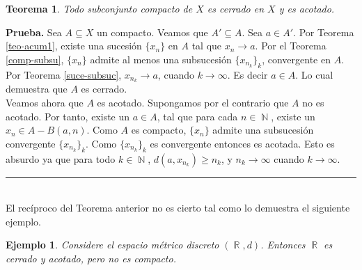 \documentclass[x11names, 12pt]{book}
\newtheorem{teorema}{Teorema}
\newtheorem{example}{Ejemplo}
\newenvironment{prueba}[1][Prueba]{\noindent\textbf{#1.} }{\ \rule{0.5em}{0.5em}}
\DeclareMathOperator{\ene}{\mathbb{N}}
\DeclareMathOperator{\R}{\mathbb{R}}
\begin{document}
\begin{teorema}
Todo subconjunto compacto de $X$ es cerrado en $X$ y es acotado.
\end{teorema}
\begin{prueba}
Sea $A\subseteq X$ un compacto. Veamos que $A'\subseteq A$. Sea $a\in A'$. Por Teorema \ref{teo-acum1}, existe una sucesión $\{x_n\}$ en $A$ tal que $x_n\to a.$ Por el Teorema \ref{comp-subsu}, $\{x_n\}$ admite al menos una subsucesión $\{x_{n_k}\}_k$,  convergente en $A$. Por Teorema \ref{suce-subsuc}, $x_{n_k} \to a$, cuando $k\to \infty$. Es decir $a\in A$. Lo cual demuestra que $A$ es cerrado. \\
Veamos ahora que $A$ es acotado. Supongamos por el contrario que $A$ no es acotado. Por tanto, existe un $a\in A$, tal que para cada $n\in \ene$, existe un $x_n \in A -B(a, n)$. Como $A$ es compacto, $\{x_n\}$ admite una subsucesión convergente $\{x_{n_k}\}_k$. Como $\{x_{n_k}\}_k$ es convergente entonces es acotada. Esto es absurdo ya que para todo $k\in \ene$, $d(a, x_{n_k}) \geq n_k$, y $n_k\to \infty$ cuando $k\to \infty .$
\end{prueba}\\


El recíproco del Teorema anterior no es cierto tal como lo demuestra el siguiente ejemplo.
\begin{example}
Considere el espacio métrico discreto $(\R, d)$. Entonces $\R$ es cerrado y acotado, pero no es compacto.
\end{example}
\end{document}

